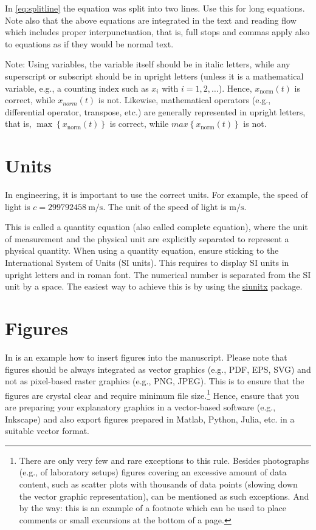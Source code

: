 In \eqref{eq:splitline} the equation was split into two lines. Use this for long equations. Note also that the above equations are integrated in the text and reading flow which includes proper interpunctuation, that is, full stops and commas apply also to equations as if they would be normal text.

Note: Using variables, the variable itself should be in italic letters, while any superscript or subscript should be in upright letters (unless it is a mathematical variable, e.g., a counting index such as $x_i$ with $i=1,2,\ldots$). Hence, $x_\mathrm{norm}(t)$ is correct, while $x_{norm}(t)$ is not. Likewise, mathematical operators (e.g., differential operator, transpose, etc.) are generally represented in upright letters, that is, $\max\left\{x_\mathrm{norm}(t)\right\}$ is correct, while $max \left\{x_{\mathrm{norm}}(t) \right\}$ is not.

 \section{Units}
 \label{sec:units}
 In engineering, it is important to use the correct units. For example, the speed of light is $c = \SI{299792458}{\meter\per\second}$. The unit of the speed of light is $\si{\meter\per\second}$.
 
 This is called a quantity equation (also called complete equation), where the unit of measurement and the physical unit are explicitly separated to represent a physical quantity. When using a quantity equation, ensure sticking to the International System of Units (SI units). This requires to display SI units in upright letters and in roman font. The numerical number is separated from the SI unit by a space. The easiest way to achieve this is by using the \href{https://ctan.org/pkg/siunitx}{siunitx} package.    

\section{Figures}
\label{sec:architecture}
In  is an example how to insert figures into the manuscript. Please note that figures should be always integrated as vector graphics (e.g., PDF, EPS, SVG) and not as pixel-based raster graphics (e.g., PNG, JPEG). This is to ensure that the figures are crystal clear and require minimum file size.\footnote{There are only very few and rare exceptions to this rule. Besides photographs (e.g., of laboratory setups) figures covering an excessive amount of data content, such as scatter plots with thousands of data points (slowing down the vector graphic representation), can be mentioned as such exceptions. And by the way: this is an example of a footnote which can be used to place comments or small excursions at the bottom of a page.} Hence, ensure that you are preparing your explanatory graphics in a vector-based software (e.g., Inkscape) and also export figures prepared in Matlab, Python, Julia, etc. in a suitable vector format. 

